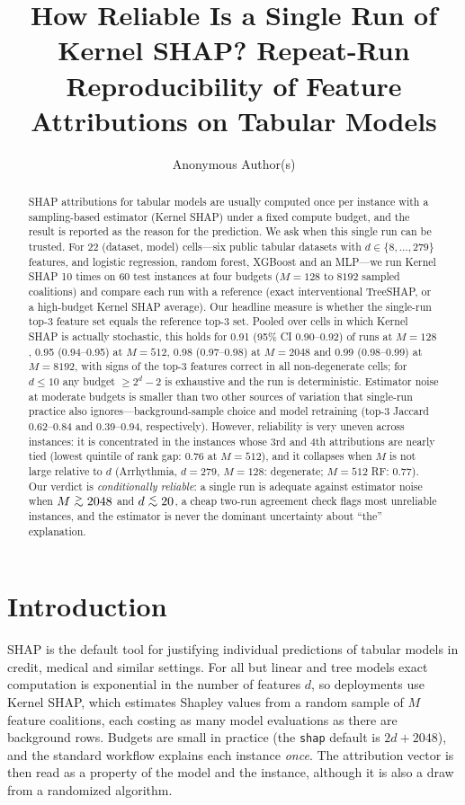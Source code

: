 \documentclass{article}
\title{How Reliable Is a Single Run of Kernel SHAP? Repeat-Run Reproducibility of Feature Attributions on Tabular Models}
\author{Anonymous Author(s)}
\newcommand{\gtrsim}{\mathrel{\raisebox{-0.5ex}{$\stackrel{>}{\sim}$}}}
\newcommand{\lesssim}{\mathrel{\raisebox{-0.5ex}{$\stackrel{<}{\sim}$}}}
\begin{document}
\maketitle
\begin{abstract}
SHAP attributions for tabular models are usually computed once per instance with a sampling-based estimator (Kernel SHAP) under a fixed compute budget, and the result is reported as the reason for the prediction. We ask when this single run can be trusted. For 22 (dataset, model) cells---six public tabular datasets with $d\in\{8,\dots,279\}$ features, and logistic regression, random forest, XGBoost and an MLP---we run Kernel SHAP 10 times on 60 test instances at four budgets ($M{=}128$ to $8192$ sampled coalitions) and compare each run with a reference (exact interventional TreeSHAP, or a high-budget Kernel SHAP average). Our headline measure is whether the single-run top-3 feature set equals the reference top-3 set. Pooled over cells in which Kernel SHAP is actually stochastic, this holds for 0.91 (95\% CI 0.90--0.92) of runs at $M{=}128$, 0.95 (0.94--0.95) at $M{=}512$, 0.98 (0.97--0.98) at $M{=}2048$ and 0.99 (0.98--0.99) at $M{=}8192$, with signs of the top-3 features correct in all non-degenerate cells; for $d\le 10$ any budget $\ge 2^d-2$ is exhaustive and the run is deterministic. Estimator noise at moderate budgets is smaller than two other sources of variation that single-run practice also ignores---background-sample choice and model retraining (top-3 Jaccard 0.62--0.84 and 0.39--0.94, respectively). However, reliability is very uneven across instances: it is concentrated in the instances whose 3rd and 4th attributions are nearly tied (lowest quintile of rank gap: 0.76 at $M{=}512$), and it collapses when $M$ is not large relative to $d$ (Arrhythmia, $d{=}279$, $M{=}128$: degenerate; $M{=}512$ RF: 0.77). Our verdict is \emph{conditionally reliable}: a single run is adequate against estimator noise when $M\gtrsim 2048$ and $d\lesssim 20$, a cheap two-run agreement check flags most unreliable instances, and the estimator is never the dominant uncertainty about ``the'' explanation.
\end{abstract}

\section{Introduction}
SHAP \citep{lundberg2017} is the default tool for justifying individual predictions of tabular models in credit, medical and similar settings. For all but linear and tree models exact computation is exponential in the number of features $d$, so deployments use Kernel SHAP, which estimates Shapley values from a random sample of $M$ feature coalitions, each costing as many model evaluations as there are background rows. Budgets are small in practice (the \texttt{shap} default is $2d{+}2048$), and the standard workflow explains each instance \emph{once}. The attribution vector is then read as a property of the model and the instance, although it is also a draw from a randomized algorithm.
\end{document}

